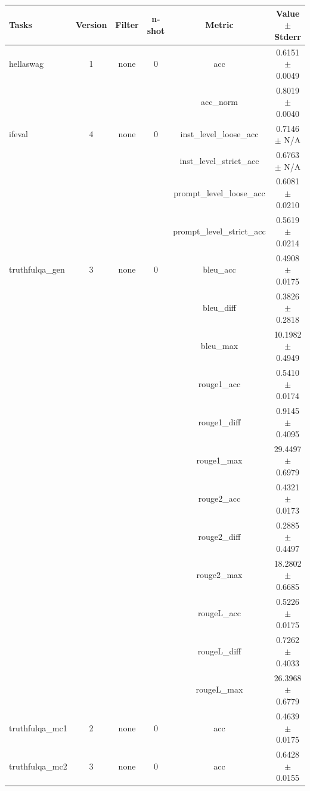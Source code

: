 \documentclass{ifacconf}
\begin{document}
\begin{strip}
\begin{minipage}{\textwidth}
    \begin{table}[H]
    \centering
    \begin{tabular}{|l|c|c|c|c|c|}
    \hline
    \textbf{Tasks} & \textbf{Version} & \textbf{Filter} & \textbf{n-shot} & \textbf{Metric} & \textbf{Value} $\pm$ \textbf{Stderr} \\ \hline
    hellaswag & 1 & none & 0 & acc & 0.6151 $\pm$ 0.0049 \\ \hline
    & & & & acc\_norm & 0.8019 $\pm$ 0.0040 \\ \hline
    ifeval & 4 & none & 0 & inst\_level\_loose\_acc & 0.7146 $\pm$ N/A \\ \hline
    & & & & inst\_level\_strict\_acc & 0.6763 $\pm$ N/A \\ \hline
    & & & & prompt\_level\_loose\_acc & 0.6081 $\pm$ 0.0210 \\ \hline
    & & & & prompt\_level\_strict\_acc & 0.5619 $\pm$ 0.0214 \\ \hline
    truthfulqa\_gen & 3 & none & 0 & bleu\_acc & 0.4908 $\pm$ 0.0175 \\ \hline
    & & & & bleu\_diff & 0.3826 $\pm$ 0.2818 \\ \hline
    & & & & bleu\_max & 10.1982 $\pm$ 0.4949 \\ \hline
    & & & & rouge1\_acc & 0.5410 $\pm$ 0.0174 \\ \hline
    & & & & rouge1\_diff & 0.9145 $\pm$ 0.4095 \\ \hline
    & & & & rouge1\_max & 29.4497 $\pm$ 0.6979 \\ \hline
    & & & & rouge2\_acc & 0.4321 $\pm$ 0.0173 \\ \hline
    & & & & rouge2\_diff & 0.2885 $\pm$ 0.4497 \\ \hline
    & & & & rouge2\_max & 18.2802 $\pm$ 0.6685 \\ \hline
    & & & & rougeL\_acc & 0.5226 $\pm$ 0.0175 \\ \hline
    & & & & rougeL\_diff & 0.7262 $\pm$ 0.4033 \\ \hline
    & & & & rougeL\_max & 26.3968 $\pm$ 0.6779 \\ \hline
    truthfulqa\_mc1 & 2 & none & 0 & acc & 0.4639 $\pm$ 0.0175 \\ \hline
    truthfulqa\_mc2 & 3 & none & 0 & acc & 0.6428 $\pm$ 0.0155 \\ \hline
    \end{tabular}
    \label{tab:qwen25_q4km}
    \end{table}
\end{minipage}
\end{strip}
\end{document}
